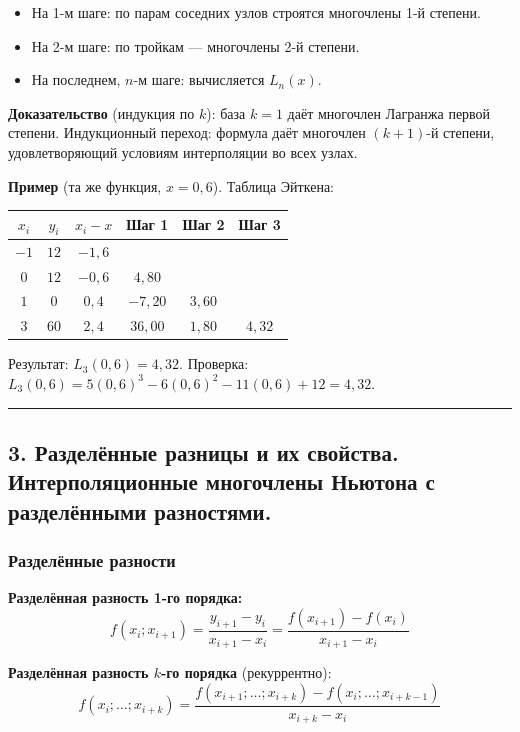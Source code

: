 \documentclass[14pt,a4paper]{extarticle}
\begin{document}
\begin{itemize}
    \item На 1-м шаге: по парам соседних узлов строятся многочлены 1-й степени.
    \item На 2-м шаге: по тройкам --- многочлены 2-й степени.
    \item На последнем, $n$-м шаге: вычисляется $L_n(x)$.
\end{itemize}

\textbf{Доказательство} (индукция по $k$): база $k = 1$ даёт многочлен Лагранжа первой степени. Индукционный переход: формула даёт многочлен $(k+1)$-й степени, удовлетворяющий условиям интерполяции во всех узлах.

\textbf{Пример} (та же функция, $x = 0{,}6$). Таблица Эйткена:

\begin{center}
\begin{tabular}{c|c|c|c|c|c}
\toprule
$x_i$ & $y_i$ & $x_i - x$ & Шаг 1 & Шаг 2 & Шаг 3 \\
\midrule
$-1$ & $12$ & $-1{,}6$ & & & \\
$0$ & $12$ & $-0{,}6$ & $4{,}80$ & & \\
$1$ & $0$ & $0{,}4$ & $-7{,}20$ & $3{,}60$ & \\
$3$ & $60$ & $2{,}4$ & $36{,}00$ & $1{,}80$ & $4{,}32$ \\
\bottomrule
\end{tabular}
\end{center}

Результат: $L_3(0{,}6) = 4{,}32$. Проверка: $L_3(0{,}6) = 5(0{,}6)^3 - 6(0{,}6)^2 - 11(0{,}6) + 12 = 4{,}32$. \checkmark

\hrule\bigskip

\subsection{3. Разделённые разницы и их свойства. Интерполяционные многочлены Ньютона с разделёнными разностями.}

\subsubsection{Разделённые разности}

\textbf{Разделённая разность 1-го порядка:}
\[f(x_i; x_{i+1}) = \frac{y_{i+1} - y_i}{x_{i+1} - x_i} = \frac{f(x_{i+1}) - f(x_i)}{x_{i+1} - x_i}\]

\textbf{Разделённая разность $k$-го порядка} (рекуррентно):
\[f(x_i; \ldots; x_{i+k}) = \frac{f(x_{i+1}; \ldots; x_{i+k}) - f(x_i; \ldots; x_{i+k-1})}{x_{i+k} - x_i}\]
\end{document}

